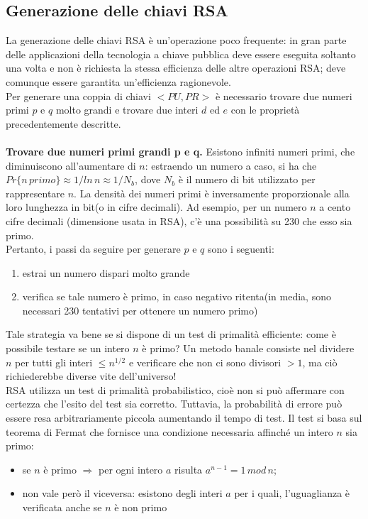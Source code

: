 \subsection{Generazione delle chiavi RSA}
La generazione delle chiavi RSA è un'operazione poco frequente: in gran parte delle applicazioni della tecnologia a chiave pubblica deve essere eseguita soltanto una volta e non è richiesta la stessa efficienza delle altre operazioni RSA; deve comunque essere garantita un'efficienza ragionevole. \\
Per generare una coppia di chiavi $<PU,PR>$ è necessario trovare due numeri primi $p$ e $q$ molto grandi e trovare due interi $d$ ed $e$ con le proprietà precedentemente descritte. \\ \\
\textbf{Trovare due numeri primi grandi p e q.} Esistono infiniti numeri primi, che diminuiscono all'aumentare di $n$: estraendo un numero a caso, si ha che $Pr \{ n \, primo \} \approx 1/{ln \, n} \approx 1/N_{b}$, dove $N_{b}$ è il numero di bit utilizzato per rappresentare $n$. La densità dei numeri primi è inversamente proporzionale alla loro lunghezza in bit(o in cifre decimali). Ad esempio, per un numero $n$ a cento cifre decimali (dimensione usata in RSA), c'è una possibilità su 230 che esso sia primo. \\ Pertanto, i passi da seguire per generare $p$ e $q$ sono i seguenti: \begin{enumerate}
\item estrai un numero dispari molto grande
\item verifica se tale numero è primo, in caso negativo ritenta(in media, sono necessari 230 tentativi per ottenere un numero primo)
\end{enumerate}
Tale strategia va bene se si dispone di un test di primalità efficiente: come è possibile testare se un intero $n$ è primo? Un metodo banale consiste nel dividere $n$ per tutti gli interi $ \le n^{1/2}$ e verificare che non ci sono divisori $> 1$, ma ciò richiederebbe diverse vite dell'universo! \\ RSA utilizza un test di primalità probabilistico, cioè non si può affermare con certezza che l'esito del test sia corretto. Tuttavia, la probabilità di errore può essere resa
arbitrariamente piccola aumentando il tempo di test. Il test si basa sul teorema di Fermat che fornisce una condizione necessaria affinché un intero $n$ sia primo: \begin{itemize}
\item se $n$ è primo $ \Rightarrow$ per ogni intero $a$ risulta $a^{n-1} = 1 \, mod \, n $;
\item non vale però il viceversa: esistono degli interi $a$ per i quali, l'uguaglianza è verificata anche se $n$ è non primo \end{itemize} 
